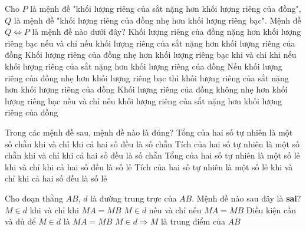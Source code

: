 \begin{ex}%
	Cho $P$ là mệnh đề "khối lượng riêng của sắt nặng hơn khối lượng riêng của đồng", $Q$ là mệnh đề "khối lượng riêng của đồng nhẹ hơn khối lượng riêng bạc". Mệnh đề $\overline{Q} \Leftrightarrow P$ là mệnh đề nào dưới đây?
	\choice 
	{Khối lượng riêng của đồng nặng hơn khối lượng riêng bạc nếu và chỉ nếu khối lượng riêng của sắt nặng hơn khối lượng riêng của đồng}
	{Khối lượng riêng của đồng nhẹ hơn khối lượng riêng bạc khi và chỉ khi nếu khối lượng riêng của sắt nặng hơn khối lượng riêng của đồng}
	{Nếu khối lượng riêng của đồng nhẹ hơn khối lượng riêng bạc thì khối lượng riêng của sắt nặng hơn khối lượng riêng của đồng}
	{\True Khối lượng riêng của đồng không nhẹ hơn khối lượng riêng bạc nếu và chỉ nếu khối lượng riêng của sắt nặng hơn khối lượng riêng của đồng}
\end{ex}

\begin{ex}%
	Trong các mệnh đề sau, mệnh đề nào là đúng?
	\choice 
	{Tổng của hai số tự nhiên là một số chẵn khi và chỉ khi cả hai số đều là số chẵn}
	{Tích của hai số tự nhiên là một số chẵn khi và chỉ khi cả hai số đều là số chẵn}
	{Tổng của hai số tự nhiên là một số lẻ khi và chỉ khi cả hai số đều là số lẻ}
	{\True Tích của hai số tự nhiên là một số lẻ khi và chỉ khi cả hai số đều là số lẻ}
\end{ex}

\begin{ex}%
	Cho đoạn thẳng $AB$, $d$ là đường trung trực của $AB$. Mệnh đề nào sau đây là \textbf{sai}?
	\choice
	{$M \in d$ khi và chỉ khi $MA=MB$}
	{$M \in d$ nếu và chỉ nếu $MA=MB$}
	{Điều kiện cần và đủ để $M \in d$ là $MA=MB$}
	{\True $M \in d \Rightarrow M$ là trung điểm của $AB$}
\end{ex}

